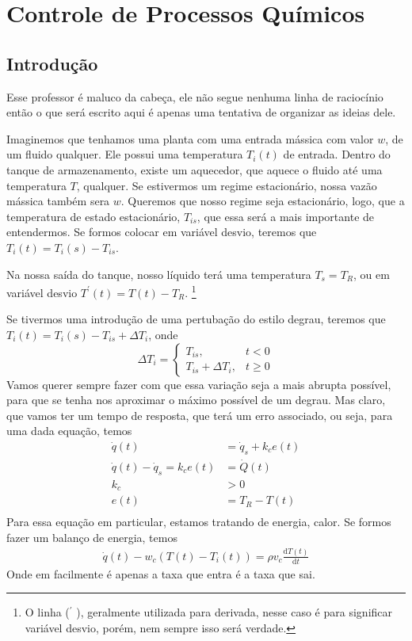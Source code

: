 \chapter{Controle de Processos Químicos}
\label{chap:cpq}
\section{Introdução}
\label{sec:cpq-intro}
Esse professor é maluco da cabeça, ele não segue nenhuma linha de raciocínio então o que será
escrito aqui é apenas uma tentativa de organizar as ideias dele. \par

Imaginemos que tenhamos uma planta com uma entrada mássica com valor \(w\), de um fluido qualquer.
Ele possui uma temperatura \(T_i(t)\) de entrada. Dentro do tanque de armazenamento, existe um
aquecedor, que aquece o fluido até uma temperatura \(T\), qualquer. Se estivermos um regime
estacionário, nossa vazão mássica também sera \(w\). Queremos que nosso regime seja estacionário,
logo, que a temperatura de estado estacionário, \(T_{is}\), que essa será a mais importante de
entendermos. Se formos colocar em variável desvio, teremos que \(T_i(t) = T_i(s) - T_{is}\). \par

Na nossa saída do tanque, nosso líquido terá uma temperatura \(T_{s} = T_R\), ou em variável desvio
\(T^{\prime} (t) = T(t) - T_R\). \footnote{O linha (\(^{\prime} \) ), geralmente utilizada para derivada, nesse caso é
para significar variável desvio, porém, nem sempre isso será verdade.}


Se tivermos uma introdução de uma pertubação do estilo degrau, teremos que \(T_i(t) = T_i(s) -
T_{is} + \Delta T_i\), onde
\begin{equation}
    \Delta T_i = \begin{cases}
        T_{is} , & t < 0 \\
        T_{is} + \Delta T_i, & t \geq 0
    \end{cases}
\end{equation}
Vamos querer sempre fazer com que essa variação seja a mais abrupta possível, para que se tenha nos
aproximar o máximo possível de um degrau. Mas claro, que vamos ter um tempo de resposta, que terá um
erro associado, ou seja, para uma dada equação, temos
\begin{align}
    \dot{q}(t) &= \dot{q}_s + k_{c} e(t)\\
    \dot{q}(t) - \dot{q}_s = k_{c} e(t) &= \dot{Q}(t)\\
    k_{c} &> 0\\
    e(t) &= T_R - T(t)\\
\end{align}
Para essa equação em particular, estamos tratando de energia, calor. Se formos fazer um balanço de
energia, temos
\begin{align}
    \dot{q}(t) - w_{c} \left( T(t) - T_{i} (t) \right) = \rho v_{c} \frac{\mathrm{d}T(t)}{\mathrm{d}t}  
\end{align}
Onde em facilmente é apenas a taxa que entra é a taxa que sai.
